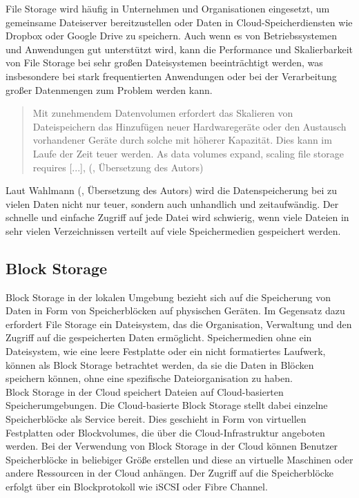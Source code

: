 File Storage wird häufig in Unternehmen und Organisationen eingesetzt, um gemeinsame Dateiserver bereitzustellen oder Daten in Cloud-Speicherdiensten wie Dropbox oder Google Drive zu speichern.
Auch wenn es von Betriebssystemen und Anwendungen gut unterstützt wird, kann die Performance und Skalierbarkeit von File Storage bei sehr großen Dateisystemen beeinträchtigt werden, was insbesondere bei stark frequentierten Anwendungen oder bei der Verarbeitung großer Datenmengen zum Problem werden kann. 

\begin{quote}
	Mit zunehmendem Datenvolumen erfordert das Skalieren von Dateispeichern das Hinzufügen neuer Hardwaregeräte oder den Austausch vorhandener Geräte durch solche mit höherer Kapazität. Dies kann im Laufe der Zeit teuer werden. \glqq As data volumes expand, scaling file storage requires [...]\grqq, (\cite{nx-fileScala}, Übersetzung des Autors)
\end{quote}

Laut Wahlmann (\citeyear{nx-fileScala}, Übersetzung des Autors) wird die Datenspeicherung bei zu vielen Daten nicht nur teuer, sondern auch unhandlich und zeitaufwändig. Der schnelle und einfache Zugriff auf jede Datei wird schwierig, wenn viele Dateien in sehr vielen Verzeichnissen verteilt auf viele Speichermedien gespeichert werden. 

\newpage

\subsection{Block Storage}

Block Storage in der lokalen Umgebung bezieht sich auf die Speicherung von Daten in Form von Speicherblöcken auf physischen Geräten. Im Gegensatz dazu erfordert File Storage ein Dateisystem, das die Organisation, Verwaltung und den Zugriff auf die gespeicherten Daten ermöglicht. Speichermedien ohne ein Dateisystem, wie eine leere Festplatte oder ein nicht formatiertes Laufwerk, können als Block Storage betrachtet werden, da sie die Daten in Blöcken speichern können, ohne eine spezifische Dateiorganisation zu haben.\\

Block Storage in der Cloud speichert Dateien auf Cloud-basierten Speicherumgebungen. Die Cloud-basierte Block Storage stellt dabei einzelne Speicherblöcke als Service bereit. Dies geschieht in Form von virtuellen Festplatten oder Blockvolumes, die über die Cloud-Infrastruktur angeboten werden. Bei der Verwendung von Block Storage in der Cloud können Benutzer Speicherblöcke in beliebiger Größe erstellen und diese an virtuelle Maschinen oder andere Ressourcen in der Cloud anhängen. Der Zugriff auf die Speicherblöcke erfolgt über ein Blockprotokoll wie iSCSI oder Fibre Channel.\\

